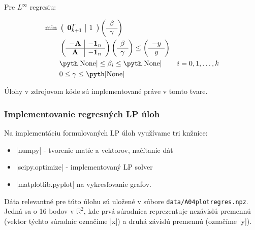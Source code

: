 \documentclass[12pt,oneside,a4paper,slovak]{article}
\begin{document}
Pre $L^{\infty}$ regresiu:

\begin{align*}
	\text{min}~ &
	\left(
	\begin{array}{c|c}
		\mathbf{0}_{k+1}^T & 1
	\end{array}
	\right)
	\left(
	\begin{array}{c}
		\beta \\
		\hline
		\gamma
	\end{array}
	\right) \\
	&\left(
	\begin{array}{c|c}
		-\mathbf{A} & -\mathbf{1}_n \\
		\hline
		\mathbf{A} & -\mathbf{1}_n
	\end{array}
	\right)
	\left(
	\begin{array}{c}
		\beta \\
		\hline
		\gamma
	\end{array}
	\right)
	\leq
	\left(
	\begin{array}{c}
		-y \\
		\hline
		y
	\end{array}
	\right) \\
	&\text{\pyth|None|} \leq \beta_i \leq \text{\pyth|None|} &i = 0,1,\dots,k\\
	&0 \leq \gamma \leq \text{\pyth|None|}
\end{align*}

Úlohy v zdrojovom kóde sú implementované práve v tomto tvare.

\subsubsection*{Implementovanie regresných LP úloh}

Na implementáciu formulovaných LP úloh využívame tri knžnice:

\begin{itemize}
	\item \pyth|numpy| - tvorenie matíc a vektorov, načítanie dát
	\item \pyth|scipy.optimize| - implementovaný LP solver
	\item \pyth|matplotlib.pyplot| na vykresľovanie grafov.
\end{itemize}

Dáta relevantné pre túto úlohu sú uložené v súbore \verb|data/A04plotregres.npz|. Jedná sa o 16 bodov v $\mathbb{R}^2$, kde prvá súradnica reprezentuje nezávislú premennú (vektor týchto súradníc označíme \pyth|x|) a druhá závislú premennú (označíme \pyth|y|). 
\end{document}
